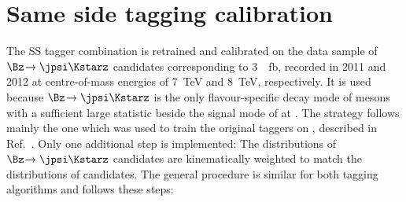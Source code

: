 \section{Same side tagging calibration}
\label{sec:SScalibration}

The SS tagger combination is retrained and calibrated on the data sample of \mbox{$\Bz\!\to\jpsi\Kstarz$} candidates corresponding to \SI{3}{\per\femto\barn}, recorded in \num{2011} and \num{2012} at centre-of-mass energies of \SI{7}{\tera\electronvolt} and \SI{8}{\tera\electronvolt}, respectively.
It is used because $\Bz\!\to\jpsi\Kstarz$ is the only flavour-specific decay mode of \Bz mesons with a sufficient large statistic beside the signal mode of \BdToDpi at \lhcb.
The strategy follows mainly the one which was used to train the original taggers on \BdToDpi, described in Ref.~\cite{Aaij:2016rdg}.
Only one additional step is implemented:
The distributions of $\Bz\!\to\jpsi\Kstarz$ candidates are kinematically weighted to match the distributions of \BdToDpi candidates.
The general procedure is similar for both tagging algorithms and follows these steps:
